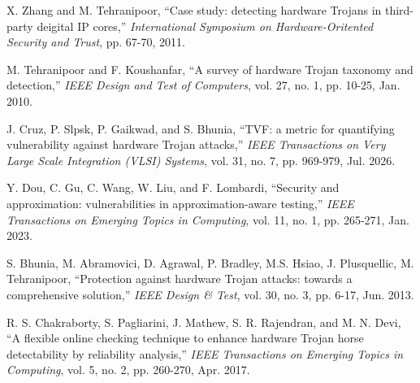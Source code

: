 \documentclass[10pt,journal, compsoc]{IEEEtran}
\begin{document}
\begin{thebibliography}{99}


X. Zhang and M. Tehranipoor, ``Case study: detecting hardware Trojans in third-party deigital IP cores,'' \textit{International Symposium on Hardware-Oritented Security and Trust}, pp. 67-70, 2011.











M. Tehranipoor and F. Koushanfar, ``A survey of hardware Trojan taxonomy and detection,'' \textit{IEEE Design and Test of Computers}, vol. 27, no. 1, pp. 10-25, Jan. 2010.

J. Cruz, P. Slpsk, P. Gaikwad, and S. Bhunia, ``TVF: a metric for quantifying vulnerability against hardware Trojan attacks,'' \textit{IEEE Transactions on Very Large Scale Integration (VLSI) Systems}, vol. 31, no. 7, pp. 969-979, Jul. 2026.



Y. Dou, C. Gu, C. Wang, W. Liu, and F. Lombardi, ``Security and approximation: vulnerabilities in approximation-aware testing,'' \textit{IEEE Transactions on Emerging Topics in Computing}, vol. 11, no. 1, pp. 265-271, Jan. 2023.



S. Bhunia, M. Abramovici, D. Agrawal, P. Bradley, M.S. Hsiao, J. Plusquellic, M. Tehranipoor, ``Protection against hardware Trojan attacks: towards a comprehensive solution,'' \textit{IEEE Design \& Test}, vol. 30, no. 3,  pp. 6-17, Jun. 2013.


R. S. Chakraborty, S. Pagliarini, J. Mathew, S. R. Rajendran, and M. N. Devi, ``A flexible online checking technique to enhance hardware Trojan horse detectability by reliability analysis,'' \textit{IEEE Transactions on Emerging Topics in Computing}, vol. 5, no. 2, pp. 260-270, Apr. 2017.






\end{thebibliography}
\end{document}
